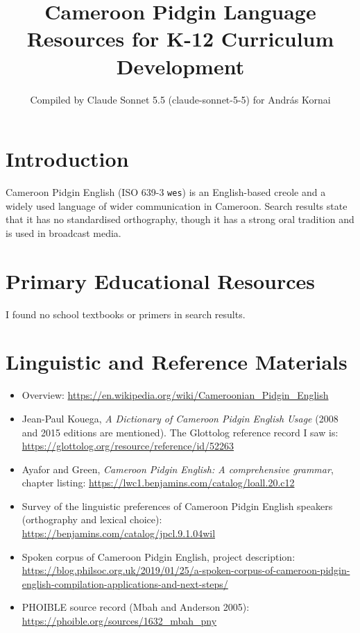 \documentclass[12pt]{article}
\title{Cameroon Pidgin Language Resources for K-12 Curriculum Development}
\author{Compiled by Claude Sonnet 5.5 (claude-sonnet-5-5) for Andr\'as Kornai}
\date{}
\begin{document}
\maketitle

\section{Introduction}
Cameroon Pidgin English (ISO 639-3 \texttt{wes}) is an English-based creole and a widely used language of wider communication in Cameroon. Search results state that it has no standardised orthography, though it has a strong oral tradition and is used in broadcast media.

\section{Primary Educational Resources}
I found no school textbooks or primers in search results.

\section{Linguistic and Reference Materials}
\begin{itemize}
\item Overview: \url{https://en.wikipedia.org/wiki/Cameroonian_Pidgin_English}
\item Jean-Paul Kouega, \emph{A Dictionary of Cameroon Pidgin English Usage} (2008 and 2015 editions are mentioned). The Glottolog reference record I saw is: \url{https://glottolog.org/resource/reference/id/52263}
\item Ayafor and Green, \emph{Cameroon Pidgin English: A comprehensive grammar}, chapter listing: \url{https://lwc1.benjamins.com/catalog/loall.20.c12}
\item Survey of the linguistic preferences of Cameroon Pidgin English speakers (orthography and lexical choice): \url{https://benjamins.com/catalog/jpcl.9.1.04wil}
\item Spoken corpus of Cameroon Pidgin English, project description: \url{https://blog.philsoc.org.uk/2019/01/25/a-spoken-corpus-of-cameroon-pidgin-english-compilation-applications-and-next-steps/}
\item PHOIBLE source record (Mbah and Anderson 2005): \url{https://phoible.org/sources/1632_mbah_pny}
\end{itemize}
\end{document}
